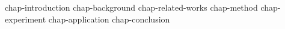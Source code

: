 % 
% 
% 
% 
% 
% 
% 

{chap-introduction}
{chap-background}
{chap-related-works}
{chap-method}
{chap-experiment}
{chap-application}
{chap-conclusion}

% 
% 
% 
% 
% 
% 

